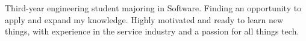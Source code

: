 \documentclass[9pt]{developercv} %
\begin{document}
\vspace{0.5cm}



\begin{minipage}[t]{0.4\textwidth} %
	\vspace{-\baselineskip} %

	Third-year engineering student majoring in Software. Finding an opportunity to apply and expand my knowledge. Highly motivated and ready to learn new things, with experience in the service industry and a passion for all things tech. %
\end{minipage}
\hfill %
\begin{minipage}[t]{0.5\textwidth} %
	\vspace{-\baselineskip} %
	\begin{barchart}{5.5}
	\end{barchart}
\end{minipage}

\begin{center}
\end{center}


\end{document}
